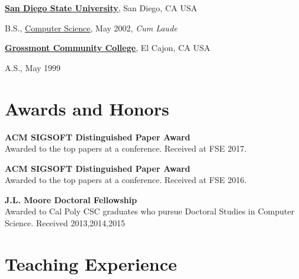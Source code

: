 \documentclass[10pt]{article}
\begin{document}
\href{https://www.sdsu.edu/}{\textbf{San Diego State University}},
San Diego, CA USA
\begin{outerlist}

\item[] B.S.,
        \href{https://www.cs.sdsu.edu/}
             {Computer Science}, May 2002, \emph{Cum Laude}
\end{outerlist}
\vspace{.5\baselineskip}


\href{http://www.grossmont.edu/}{\textbf{Grossmont Community College}},
El Cajon, CA USA

\begin{outerlist}

\item[] A.S.,
             May 1999
\end{outerlist}

\section{Awards and Honors}
\textbf{ACM SIGSOFT Distinguished Paper Award}\\
Awarded to the top papers at a conference. Received at FSE 2017.

\textbf{ACM SIGSOFT Distinguished Paper Award}\\
Awarded to the top papers at a conference. Received at FSE 2016.

\textbf{J.L. Moore Doctoral Fellowship}  \\
Awarded to Cal Poly CSC graduates who pursue Doctoral Studies in Computer Science. Received 2013,2014,2015



%
%
%





\section{Teaching Experience}
\end{document}
